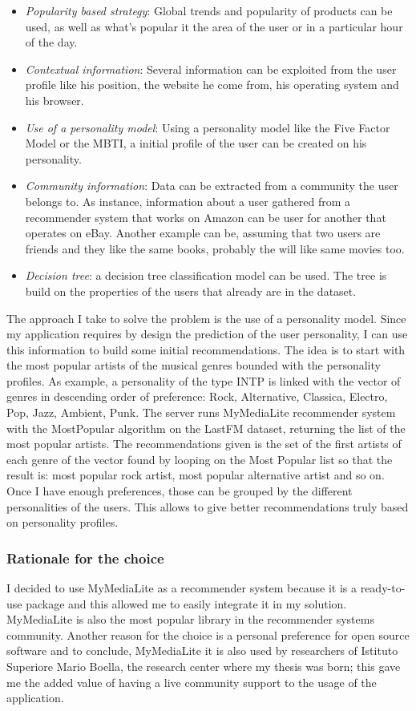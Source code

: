 \documentclass[b5paper,10pt,twoside,cucitura]{toptesi}
\begin{document}
\begin{itemize}
	\item \textit{Popularity based strategy}: Global trends and popularity of products can be used, as well as what's popular it the area of the user or in a particular hour of the day.
	\item \textit{Contextual information}: Several information can be exploited from the user profile like his position, the website he come from, his operating system and his browser.
	\item \textit{Use of a personality model}: Using a personality model like the Five Factor Model or the MBTI, a initial profile of the user can be created on his personality.
	\item \textit{Community information}: Data can be extracted from a community the user belongs to. As instance, information about a user gathered from a recommender system that works on Amazon can be user for another that operates on eBay. Another example can be, assuming that two users are friends and they like the same books, probably the will like same movies too.
	\item \textit{Decision tree}: a decision tree classification model can be used. The tree is build on the properties of the users that already are in the dataset.
\end{itemize}

The approach I take to solve the problem is the use of a personality model. Since my application requires by design the prediction of the user personality, I can use this information to build some initial recommendations. The idea is to start with the most popular artists of the musical genres bounded with the personality profiles. As example, a personality of the type INTP is linked with the vector of genres in descending order of preference: Rock, Alternative, Classica, Electro, Pop, Jazz, Ambient, Punk. The server runs MyMediaLite recommender system with the MostPopular algorithm on the LastFM dataset, returning the list of the most popular artists. The recommendations given is the set of the first artists of each genre of the vector found by looping on the Most Popular list so that the result is: most popular rock artist, most popular alternative artist and so on. Once I have enough preferences, those can be grouped by the different personalities of the users. This allows to give better recommendations truly based on personality profiles.

\subsubsection{Rationale for the choice}
I decided to use MyMediaLite as a recommender system because it is a ready-to-use package and this allowed me to easily integrate it in my solution. MyMediaLite is also the most popular library in the recommender systems community. Another reason for the choice is a personal preference for open source software and to conclude, MyMediaLite it is also used by researchers of Istituto Superiore Mario Boella, the research center where my thesis was born; this gave me the added value of having a live community support to the usage of the application.
\end{document}
